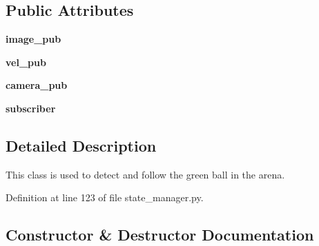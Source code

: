 \subsection*{Public Attributes}
\begin{DoxyCompactItemize}
\item 
{\bfseries image\+\_\+pub}\hypertarget{classstate__manager_1_1find__and__follow__ball_aff00cf94531440a3c05f404e3a7157ed}{}\label{classstate__manager_1_1find__and__follow__ball_aff00cf94531440a3c05f404e3a7157ed}

\item 
{\bfseries vel\+\_\+pub}\hypertarget{classstate__manager_1_1find__and__follow__ball_acfadf373311857d7df4a48ee0bba0271}{}\label{classstate__manager_1_1find__and__follow__ball_acfadf373311857d7df4a48ee0bba0271}

\item 
{\bfseries camera\+\_\+pub}\hypertarget{classstate__manager_1_1find__and__follow__ball_a6d047759897ca99cbb11fd39f8861ab9}{}\label{classstate__manager_1_1find__and__follow__ball_a6d047759897ca99cbb11fd39f8861ab9}

\item 
{\bfseries subscriber}\hypertarget{classstate__manager_1_1find__and__follow__ball_aa9a2ffdc682841e5efdaf5a6b80ec0eb}{}\label{classstate__manager_1_1find__and__follow__ball_aa9a2ffdc682841e5efdaf5a6b80ec0eb}

\end{DoxyCompactItemize}


\subsection{Detailed Description}
This class is used to detect and follow the green ball in the arena. 



Definition at line 123 of file state\+\_\+manager.\+py.



\subsection{Constructor \& Destructor Documentation}
